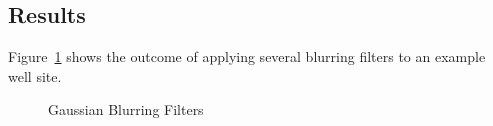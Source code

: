 \documentclass[11pt]{article}
\begin{document}
\subsection{Results}

Figure~\ref{fig:gaussian_blurring} shows the outcome of applying several blurring filters to an 
example well site.

\begin{figure}[H]
    \centering
    {
        {
        }\hfill{
        }
    }\caption{Gaussian Blurring Filters}
    \label{fig:gaussian_blurring}
\end{figure}
\end{document}
